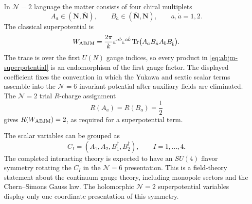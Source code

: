 In \(\mathcal N=2\) language the matter consists of four chiral multiplets
\[
  A_a\in(\mathbf N,\overline{\mathbf N}),\qquad
  B_{\dot a}\in(\overline{\mathbf N},\mathbf N),
  \qquad a,\dot a=1,2 .
\]
The classical superpotential is
\begin{equation}
  W_{\rm ABJM}
  =
  \frac{2\pi}{k}
  \varepsilon^{ab}\varepsilon^{\dot a\dot b}
  \operatorname{Tr}
  \bigl(A_aB_{\dot a}A_bB_{\dot b}\bigr).
  \label{eq:abjm-superpotential}
\end{equation}
The trace is over the first \(U(N)\) gauge indices, so every product in
\eqref{eq:abjm-superpotential} is an endomorphism of the first gauge factor.
The displayed coefficient fixes the convention in which the Yukawa and
sextic scalar terms assemble into the \(\mathcal N=6\) invariant potential
after auxiliary fields are eliminated.  The \(\mathcal N=2\) trial
\(R\)-charge assignment
\[
  R(A_a)=R(B_{\dot a})=\frac12
\]
gives \(R(W_{\rm ABJM})=2\), as required for a superpotential term.

The scalar variables can be grouped as
\[
  C_I=(A_1,A_2,B_1^\dagger,B_2^\dagger),
  \qquad I=1,\ldots,4 .
\]
The completed interacting theory is expected to have an \(SU(4)\) flavor
symmetry rotating the \(C_I\) in the \(\mathcal N=6\) presentation.  This is a
field-theory statement about the continuum gauge theory, including monopole
sectors and the Chern--Simons Gauss law.  The holomorphic \(\mathcal N=2\)
superpotential variables display only one coordinate presentation of this
symmetry.

